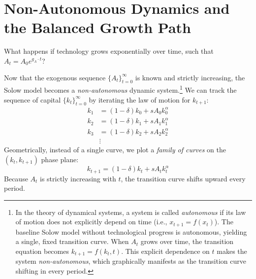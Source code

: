 \section{Non-Autonomous Dynamics and the Balanced Growth Path}

What happens if technology grows exponentially over time, such that $A_t = A_0 e^{g_A \cdot t}$?

Now that the exogenous sequence $\{A_t\}_{t = 0}^{\infty}$ is known and strictly increasing, the Solow model becomes a \textit{non-autonomous} dynamic system.\footnote{
    In the theory of dynamical systems, a system is called \textit{autonomous} if its law of motion does not explicitly depend on time (i.e., $x_{t+1} = f(x_t)$). The baseline Solow model without technological progress is autonomous, yielding a single, fixed transition curve. When $A_t$ grows over time, the transition equation becomes $k_{t+1} = f(k_t, t)$. This explicit dependence on $t$ makes the system \textit{non-autonomous}, which graphically manifests as the transition curve shifting in every period.
} We can track the sequence of capital $\{k_t\}_{t = 0}^{\infty}$ by iterating the law of motion for $k_{t+1}$:
$$
\begin{aligned}
    k_1 & = (1-\delta)k_0 + s A_0 k_0^{\alpha} \\
    k_2 & = (1-\delta)k_1 + s A_1 k_1^{\alpha} \\
    k_3 & = (1-\delta)k_2 + s A_2 k_2^{\alpha} \\
    & \vdots
\end{aligned}
$$
Geometrically, instead of a single curve, we plot a \textit{family of curves} on the $(k_t, k_{t+1})$ phase plane:
$$
k_{t+1} = (1-\delta)k_t + s A_t k_t^{\alpha}
$$
Because $A_t$ is strictly increasing with $t$, the transition curve shifts upward every period.

